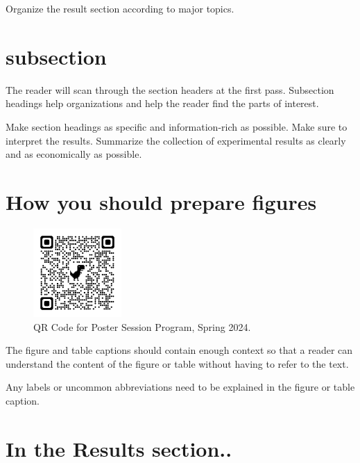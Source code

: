 Organize the result section according to major topics. 

\section{subsection}
The reader will scan through the section headers at the first pass. Subsection headings help organizations and help the reader find the parts of interest.

Make section headings as specific and information-rich as possible. Make sure to interpret the results. Summarize the collection of experimental results as clearly and as economically as possible. 

\section{How you should prepare figures}
\begin{figure}[h]
    \centering
    \includegraphics[width=0.3\textwidth]{figs/QR_PosterSessionDirectory.png}
    \vskip -0.2in
    \caption{QR Code for Poster Session Program, Spring 2024.}
    \label{fig:qr_poster}
\end{figure}
The figure and table captions should contain enough context so that a reader can understand the content of the figure or table without having to refer to the text.

Any labels or uncommon abbreviations need to be explained in the figure or table caption.

\section{In the Results section.. }

